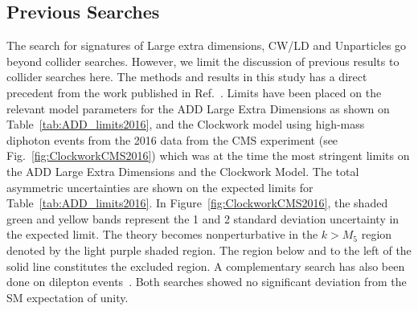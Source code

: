 \subsection{Previous Searches}

The search for signatures of Large extra dimensions, CW/LD and Unparticles go beyond collider searches. However, we limit the discussion of previous results to collider searches here. The methods and results in this study has a direct precedent from the work published in Ref.~\cite{CMS:2018dqv}. Limits have been placed on the relevant model parameters for the ADD Large Extra Dimensions as shown on Table~\ref{tab:ADD_limits2016}, and the Clockwork model using high-mass diphoton events from the 2016 data from the CMS experiment (see Fig.~\ref{fig:ClockworkCMS2016}) which was at the time the most stringent limits on the ADD Large Extra Dimensions and the Clockwork Model. The total asymmetric uncertainties are shown on the expected limits for Table~\ref{tab:ADD_limits2016}. In Figure~\ref{fig:ClockworkCMS2016}, the shaded green and yellow bands represent the 1 and 2 standard deviation uncertainty in the expected limit. The theory becomes nonperturbative in the $k > M_5$ region denoted by the light purple shaded region. The region below and to the left of the solid line constitutes the excluded region. A complementary search has also been done on dilepton events~\cite{CMS:2021ctt}. Both searches showed no significant deviation from the SM expectation of unity.

\begin{table}[pt]
	\centering
	\caption{Previous exclusion limits results on the mass scale \Ms in {\TeVns} for various conventions used in the calculation of the ADD large extra-dimensional scenario using the 2016 CMS detector data corresponding to an integrated luminosity of 35.9 \fbinv~\cite{CMS:2018dqv} only. }
	\label{tab:ADD_limits2016}
\end{table}


